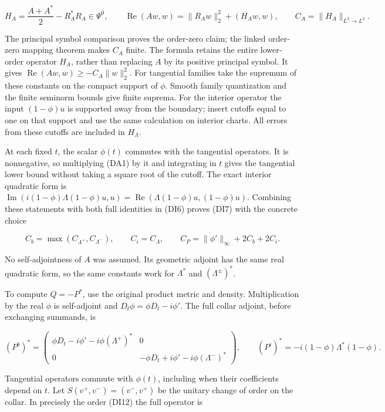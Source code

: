 \documentclass[
  11pt,
]{article}
\begin{document}
\[
 H_A=\frac{A+A^*}{2}-R_A^*R_A\in\Psi^0,
 \qquad
 \operatorname{Re}(Aw,w)=\|R_Aw\|_2^2+(H_Aw,w),
 \qquad C_A=\|H_A\|_{L^2\to L^2}.
 \tag{DA1}
\]

The principal symbol comparison proves the order-zero claim; the linked
order-zero mapping theorem makes \(C_A\) finite. The formula retains the
entire lower-order operator \(H_A\), rather than replacing \(A\) by its
positive principal symbol. It gives
\(\operatorname{Re}(Aw,w)\geq-C_A\|w\|_2^2\). For tangential families
take the supremum of these constants on the compact support of \(\phi\).
Smooth family quantization and the finite seminorm bounds give finite
suprema. For the interior operator the input \((1-\phi)u\) is supported
away from the boundary; insert cutoffs equal to one on that support and
use the same calculation on interior charts. All errors from these
cutoffs are included in \(H_\Lambda\).

At each fixed \(t\), the scalar \(\phi(t)\) commutes with the tangential
operators. It is nonnegative, so multiplying (DA1) by it and integrating
in \(t\) gives the tangential lower bound without taking a square root
of the cutoff. The exact interior quadratic form is
\(\operatorname{Im}(i(1-\phi)\Lambda(1-\phi)u,u)
=\operatorname{Re}(\Lambda(1-\phi)u,(1-\phi)u)\). Combining these
statements with both full identities in (DI6) proves (DI7) with the
concrete choice

\[
 C_b=\max(C_{\Lambda^+},C_{\Lambda^-}),\qquad
 C_i=C_\Lambda,\qquad
 C_P=\|\phi'\|_\infty+2C_b+2C_i.
 \tag{DA2}
\]

No self-adjointness of \(A\) was assumed. Its geometric adjoint has the
same real quadratic form, so the same constants work for \(\Lambda^*\)
and \((\Lambda^\pm)^*\).

To compute \(Q=-P^*\), use the original product metric and density.
Multiplication by the real \(\phi\) is self-adjoint and
\(D_t\phi=\phi D_t-i\phi'\). The full collar adjoint, before exchanging
summands, is

\[
 (P^b)^*=
 \begin{pmatrix}
  \phi D_t-i\phi'-i\phi(\Lambda^+)^*&0\\
  0&-\phi D_t+i\phi'-i\phi(\Lambda^-)^*
 \end{pmatrix},\qquad
 (P^i)^*=-i(1-\phi)\Lambda^*(1-\phi).
 \tag{DA3}
\]

Tangential operators commute with \(\phi(t)\), including when their
coefficients depend on \(t\). Let \(S(v^+,v^-)=(v^-,v^+)\) be the
unitary change of order on the collar. In precisely the order (DI12) the
full operator is
\end{document}

